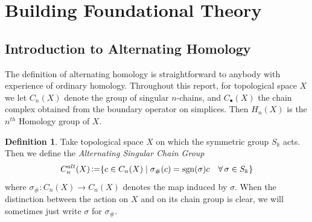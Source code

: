 \documentclass[11pt,a4paper,twoside]{article}
\theoremstyle{plain}
\theoremstyle{definition}
\newtheorem{defn}[thm]{Definition}
\theoremstyle{definition}
\theoremstyle{definition}
\theoremstyle{definition}
\theoremstyle{definition}
\DeclareMathOperator{\sgn}{sgn}
\DeclareMathOperator{\coloneqq}{\vcentcolon=}
\begin{document}
\section{Building Foundational Theory}
\label{Sec:FoundationalTheory}



\subsection{Introduction to Alternating Homology}
\label{Sec:AlternatingSingularHomology}
The definition of alternating homology is straightforward to anybody with experience of ordinary homology.
Throughout this report, for topological space $X$ we let $C_n(X)$ denote the group of singular $n$-chains,
and $C_{\bullet}(X)$ the chain complex obtained from the boundary operator on simplices. Then $H_n(X)$ is 
the $n^{th}$ Homology group of $X$.

\begin{defn}
Take topological space $X$ on which the symmetric group $S_k$ acts. Then we define the \emph{Alternating Singular Chain Group}
$$C_{n}^{alt}(X) \coloneqq \{ c \in C_n(X) \mid \sigma_\#(c) = \sgn(\sigma)c \quad \forall \,\sigma \in S_k\}$$
where $\sigma_\#:C_n(X)\rightarrow C_n(X)$ denotes the map induced by $\sigma$. When the distinction between the action on $X$ and on its chain group is clear, we will sometimes just write $\sigma$ for $\sigma_\#$.
\end{defn}
\end{document}
